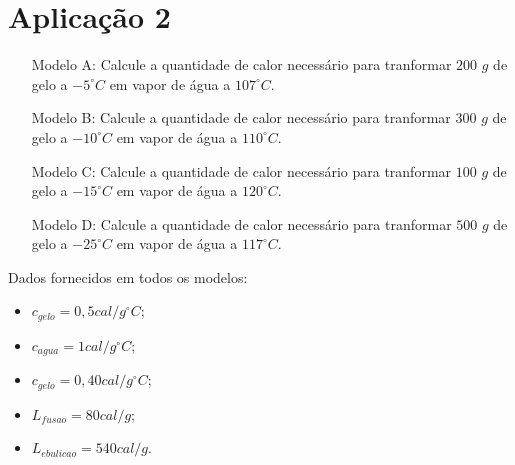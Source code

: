 \section{Aplicação 2} \label{ch:ASA2a2}
\begin{itemize}
    \item[Modelo A:] Calcule a quantidade de calor necessário para tranformar $200$ $g$ de gelo a $-5^{\circ}C$ em vapor de água a $107^{\circ}C$.
    
    \item[Modelo B:] Calcule a quantidade de calor necessário para tranformar $300$ $g$ de gelo a $-10^{\circ}C$ em vapor de água a $110^{\circ}C$.
    
    \item[Modelo C:] Calcule a quantidade de calor necessário para tranformar $100$ $g$ de gelo a $-15^{\circ}C$ em vapor de água a $120^{\circ}C$.
    
    \item[Modelo D:] Calcule a quantidade de calor necessário para tranformar $500$ $g$ de gelo a $-25^{\circ}C$ em vapor de água a $117^{\circ}C$.
    
\end{itemize}
Dados fornecidos em todos os modelos:
\begin{itemize}
    \item $c_{gelo} = 0,5 cal/g^{\circ}C$;
    \item $c_{agua} = 1 cal/g^{\circ}C$;
    \item $c_{gelo} = 0,40 cal/g^{\circ}C$;
    \item $L_{fusao} = 80 cal/g$;
    \item $L_{ebulicao} = 540 cal/g$.
\end{itemize}
\newpage

